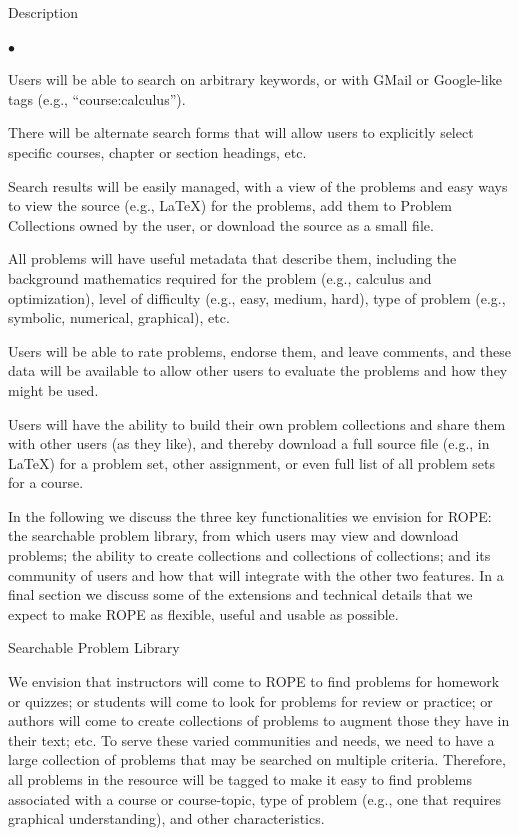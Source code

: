 \documentclass[11pt]{article}
\begin{document}
\begin{section}{Description}
\begin{list}{$\bullet$}{\setlength{\parsep}{0pt}\setlength{\itemsep}{0pt}}
  \item
    Users will be able to search on arbitrary keywords, or with GMail or
    Google-like tags (e.g., ``course:calculus'').
  \item
    There will be alternate search forms that will allow users to
    explicitly select specific courses, chapter or section headings, etc.
  \item
    Search results will be easily managed, with a view of the problems and
    easy ways to view the source (e.g., \LaTeX) for the problems, add them
    to Problem Collections owned by the user, or download the
    source as a small file.
  \item
    All problems will have useful metadata that describe them, including
    the background mathematics required for the problem (e.g., calculus
    and optimization), level of difficulty (e.g., easy, medium, hard),
    type of problem (e.g., symbolic, numerical, graphical), etc.
  \item
    Users will be able to rate problems, endorse them, and leave comments,
    and these data will be available to allow other users to evaluate the
    problems and how they might be used.
  \item
    Users will have the ability to build their own problem collections and
    share them with other users (as they like), and thereby download a
    full source file (e.g., in \LaTeX) for a problem set, other
    assignment, or even full list of all problem sets for a course.
\end{list}

In the following we discuss the three key functionalities we envision for
ROPE: the searchable problem library, from which users may view and
download problems; the ability to create collections and 
collections of collections; and its community of users and how that will
integrate with the other two features.  In a final section we discuss some
of the extensions and technical details that we expect to make ROPE as
flexible, useful and usable as possible.

\begin{subsection}{Searchable Problem Library}

We envision that instructors will come to ROPE to find problems for
homework or quizzes; or students will come to look for problems for review
or practice; or authors will come to create collections of problems to
augment those they have in their text; etc.  To serve these varied
communities and needs, we need to have a large collection of problems that
may be searched on multiple criteria.  Therefore, all problems in the
resource will be tagged to make it easy to find problems associated with a
course or course-topic, type of problem (e.g., one that requires graphical
understanding), and other characteristics.


\end{subsection}
\end{section}
\end{document}
